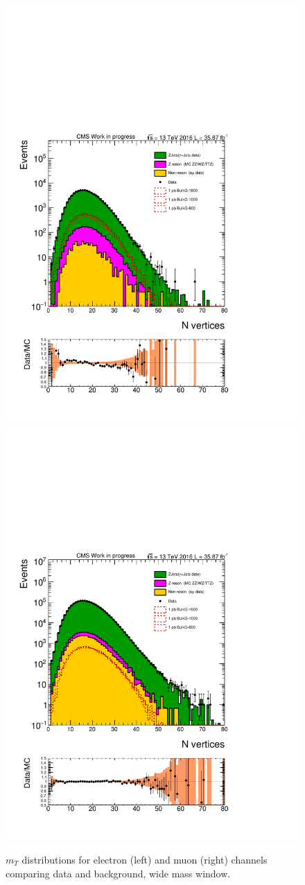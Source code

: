 \begin{figure}[htbp!]
\centering
\includegraphics[width=0.46\linewidth,page=3]{figures/ReMiniSummer16_DT_PhReMiniMCRcFixXsec_GMCPhPtWt_tightzpt50_puWeightsummer16_muoneg_gjet_metfilter_unblind_el_log_1pb.pdf}
\includegraphics[width=0.46\linewidth,page=3]{figures/ReMiniSummer16_DT_PhReMiniMCRcFixXsec_GMCPhPtWt_tightzpt50_puWeightsummer16_muoneg_gjet_metfilter_unblind_mu_log_1pb.pdf}
\caption{$m_T$ distributions for electron (left) and muon (right) channels
comparing data and background,
wide mass window.}
\label{fig:gjet_mt_wide}
\end{figure}

